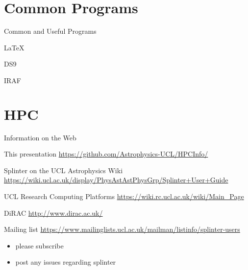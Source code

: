 \documentclass{beamer}
\begin{document}
\section{Common Programs}

\begin{frame}{Common and Useful Programs}
  \begin{block}{LaTeX}

  \end{block}

  \begin{block}{DS9}

  \end{block}

  \begin{block}{IRAF}

  \end{block}
\end{frame}

\section{HPC}

\begin{frame}{Information on the Web}
  \begin{block}{This presentation}
    \url{https://github.com/Astrophysics-UCL/HPCInfo/}
  \end{block}

    \begin{block}{Splinter on the UCL Astrophysics Wiki}
    \url{https://wiki.ucl.ac.uk/display/PhysAstAstPhysGrp/Splinter+User+Guide}
  \end{block}

  \begin{block}{UCL Research Computing Platforms}
    \url{https://wiki.rc.ucl.ac.uk/wiki/Main_Page}
  \end{block}

  \begin{block}{DiRAC}
    \url{http://www.dirac.ac.uk/}
  \end{block}

\end{frame}

\begin{frame}{Mailing list}
	\url{https://www.mailinglists.ucl.ac.uk/mailman/listinfo/splinter-users}
	\bigskip
	\begin{itemize}
		\item please subscribe
		\item post any issues regarding splinter
	\end{itemize}
\end{frame}
\end{document}
